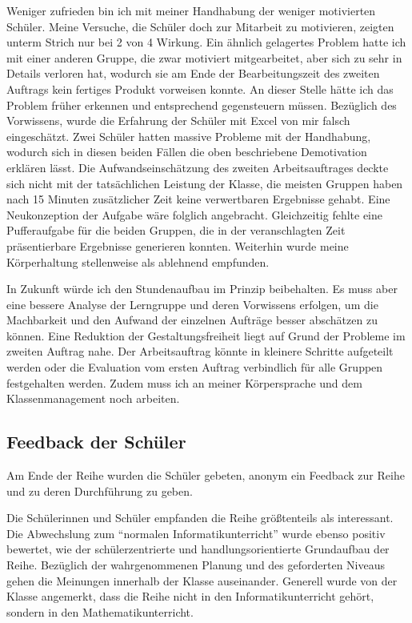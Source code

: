 Weniger zufrieden bin ich mit meiner Handhabung der weniger motivierten Schüler. Meine Versuche, die Schüler doch zur Mitarbeit zu motivieren, zeigten unterm Strich nur bei 2 von 4 Wirkung. Ein ähnlich gelagertes Problem hatte ich mit einer anderen Gruppe, die zwar motiviert mitgearbeitet, aber sich zu sehr in Details verloren hat, wodurch sie am Ende der Bearbeitungszeit des zweiten Auftrags kein fertiges Produkt vorweisen konnte. An dieser Stelle hätte ich das Problem früher erkennen und entsprechend gegensteuern müssen. Bezüglich des Vorwissens, wurde die Erfahrung der Schüler mit Excel von mir falsch eingeschätzt. Zwei Schüler hatten massive Probleme mit der Handhabung, wodurch sich in diesen beiden Fällen die oben beschriebene Demotivation erklären lässt. Die Aufwandseinschätzung des zweiten Arbeitsauftrages deckte sich nicht mit der tatsächlichen Leistung der Klasse, die meisten Gruppen haben nach 15 Minuten zusätzlicher Zeit keine verwertbaren Ergebnisse gehabt. Eine Neukonzeption der Aufgabe wäre folglich angebracht. Gleichzeitig fehlte eine Pufferaufgabe für die beiden Gruppen, die in der veranschlagten Zeit präsentierbare Ergebnisse generieren konnten. Weiterhin wurde meine Körperhaltung stellenweise als ablehnend empfunden. 

In Zukunft würde ich den Stundenaufbau im Prinzip beibehalten. Es muss aber eine bessere Analyse der Lerngruppe und deren Vorwissens erfolgen, um die Machbarkeit und den Aufwand der einzelnen Aufträge besser abschätzen zu können. Eine Reduktion der Gestaltungsfreiheit liegt auf Grund der Probleme im zweiten Auftrag nahe. Der Arbeitsauftrag könnte in kleinere Schritte aufgeteilt werden oder die Evaluation vom ersten Auftrag verbindlich für alle Gruppen festgehalten werden. Zudem muss ich an meiner Körpersprache und dem Klassenmanagement noch arbeiten. 
\subsection{Feedback der Schüler}
Am Ende der Reihe wurden die Schüler gebeten, anonym ein Feedback zur Reihe und zu deren Durchführung zu geben.

Die Schülerinnen und Schüler empfanden die Reihe größtenteils als interessant. Die Abwechslung zum ``normalen Informatikunterricht'' wurde ebenso positiv bewertet, wie der schülerzentrierte und handlungsorientierte Grundaufbau der Reihe. Bezüglich der wahrgenommenen Planung und des geforderten Niveaus gehen die Meinungen innerhalb der Klasse auseinander. Generell wurde von der Klasse angemerkt, dass die Reihe nicht in den Informatikunterricht gehört, sondern in den Mathematikunterricht.